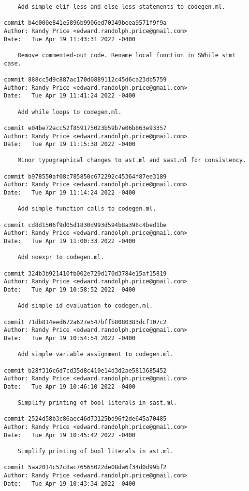 {\begin{verbatim}
    Add simple elif-less and else-less statements to codegen.ml.

commit b4e000e841e5896b9906ed70349beea9571f9f9a
Author: Randy Price <edward.randolph.price@gmail.com>
Date:   Tue Apr 19 11:43:31 2022 -0400

    Remove commented-out code. Rename local function in SWhile stmt case.

commit 888cc5d9c887ac170d0889112c45d6ca23db5759
Author: Randy Price <edward.randolph.price@gmail.com>
Date:   Tue Apr 19 11:41:24 2022 -0400

    Add while loops to codegen.ml.

commit e04be72acc52f859175023b59b7e06b863e93357
Author: Randy Price <edward.randolph.price@gmail.com>
Date:   Tue Apr 19 11:15:38 2022 -0400

    Minor typographical changes to ast.ml and sast.ml for consistency.

commit b978550af08c785850c672292c45364f87ee3189
Author: Randy Price <edward.randolph.price@gmail.com>
Date:   Tue Apr 19 11:14:24 2022 -0400

    Add simple function calls to codegen.ml.

commit cd8d1506f9d05d1830d993d594b8a398c4bed1be
Author: Randy Price <edward.randolph.price@gmail.com>
Date:   Tue Apr 19 11:00:33 2022 -0400

    Add noexpr to codegen.ml.

commit 324b3b921410fb002e729d170d3784e15af15819
Author: Randy Price <edward.randolph.price@gmail.com>
Date:   Tue Apr 19 10:58:52 2022 -0400

    Add simple id evaluation to codegen.ml.

commit 71db814eed672a627e547bffb8080383dcf107c2
Author: Randy Price <edward.randolph.price@gmail.com>
Date:   Tue Apr 19 10:54:54 2022 -0400

    Add simple variable assignment to codegen.ml.

commit b28f316c6d7cd35d8c410e14d3d2ae5813685452
Author: Randy Price <edward.randolph.price@gmail.com>
Date:   Tue Apr 19 10:46:10 2022 -0400

    Simplify printing of bool literals in sast.ml.

commit 2524d58b3c86aec46d73125bd96f2de645a70485
Author: Randy Price <edward.randolph.price@gmail.com>
Date:   Tue Apr 19 10:45:42 2022 -0400

    Simplify printing of bool literals in ast.ml.

commit 5aa2014c52c8ac76565022de08da6f34d0d99bf2
Author: Randy Price <edward.randolph.price@gmail.com>
Date:   Tue Apr 19 10:43:34 2022 -0400


\end{verbatim}}

